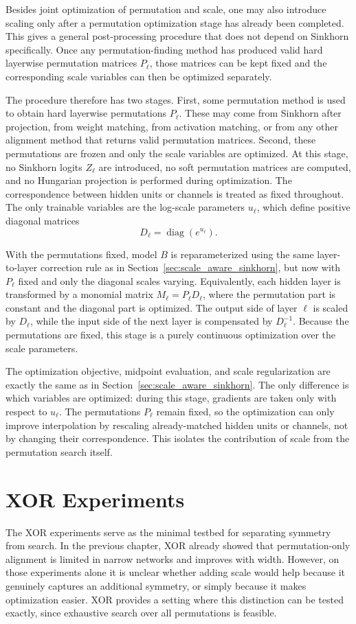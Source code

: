 \documentclass[11pt,a4paper]{report}
\begin{document}
Besides joint optimization of permutation and scale, one may also introduce scaling only after a permutation optimization stage has already been completed. This gives a general post-processing procedure that does not depend on Sinkhorn specifically. Once any permutation-finding method has produced valid hard layerwise permutation matrices \(P_\ell\), those matrices can be kept fixed and the corresponding scale variables can then be optimized separately.

The procedure therefore has two stages. First, some permutation method is used to obtain hard layerwise permutations \(P_\ell\). These may come from Sinkhorn after projection, from weight matching, from activation matching, or from any other alignment method that returns valid permutation matrices. Second, these permutations are frozen and only the scale variables are optimized. At this stage, no Sinkhorn logits \(Z_\ell\) are introduced, no soft permutation matrices are computed, and no Hungarian projection is performed during optimization. The correspondence between hidden units or channels is treated as fixed throughout. The only trainable variables are the log-scale parameters \(u_\ell\), which define positive diagonal matrices
\[
D_\ell=\operatorname{diag}(e^{u_\ell}).
\]

With the permutations fixed, model \(B\) is reparameterized using the same layer-to-layer correction rule as in Section~\ref{sec:scale_aware_sinkhorn}, but now with \(P_\ell\) fixed and only the diagonal scales varying. Equivalently, each hidden layer is transformed by a monomial matrix \(M_\ell=P_\ell D_\ell\), where the permutation part is constant and the diagonal part is optimized. The output side of layer \(\ell\) is scaled by \(D_\ell\), while the input side of the next layer is compensated by \(D_\ell^{-1}\). Because the permutations are fixed, this stage is a purely continuous optimization over the scale parameters.

The optimization objective, midpoint evaluation, and scale regularization are exactly the same as in Section~\ref{sec:scale_aware_sinkhorn}. The only difference is which variables are optimized: during this stage, gradients are taken only with respect to \(u_\ell\). The permutations \(P_\ell\) remain fixed, so the optimization can only improve interpolation by rescaling already-matched hidden units or channels, not by changing their correspondence. This isolates the contribution of scale from the permutation search itself.


\section{XOR Experiments}
The XOR experiments serve as the minimal testbed for separating symmetry from search. In the previous chapter, XOR already showed that permutation-only alignment is limited in narrow networks and improves with width. However, on those experiments alone it is unclear whether adding scale would help because it genuinely captures an additional symmetry, or simply because it makes optimization easier. XOR provides a setting where this distinction can be tested exactly, since exhaustive search over all permutations is feasible.
\end{document}
